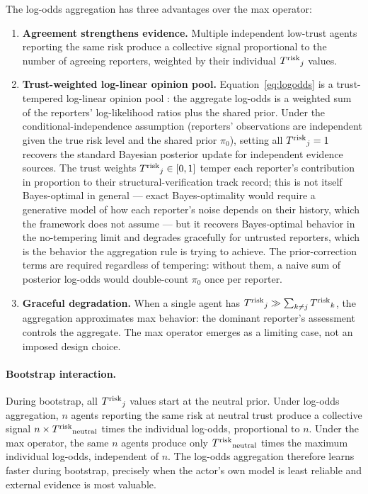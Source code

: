 The log-odds aggregation has three advantages over the max operator:
\begin{enumerate}
\item \textbf{Agreement strengthens evidence.} Multiple independent
    low-trust agents reporting the same risk produce a collective signal
    proportional to the number of agreeing reporters, weighted by their
    individual ${T^{\mathrm{risk}}}_j$ values.
\item \textbf{Trust-weighted log-linear opinion pool.}
    Equation~\eqref{eq:logodds} is a trust-tempered log-linear opinion
    pool \citep{genest1986combining}: the aggregate log-odds is a
    weighted sum of the reporters' log-likelihood ratios plus the
    shared prior. Under the conditional-independence assumption
    (reporters' observations are independent given the true risk
    level and the shared prior $\pi_0$), setting all ${T^{\mathrm{risk}}}_j = 1$
    recovers the standard Bayesian posterior update for independent
    evidence sources. The trust weights ${T^{\mathrm{risk}}}_j \in [0, 1]$ temper
    each reporter's contribution in proportion to their
    structural-verification track record; this is not itself
    Bayes-optimal in general --- exact Bayes-optimality would require
    a generative model of how each reporter's noise depends on their
    history, which the framework does not assume --- but it recovers
    Bayes-optimal behavior in the no-tempering limit and degrades
    gracefully for untrusted reporters, which is the behavior the
    aggregation rule is trying to achieve. The prior-correction
    terms are required regardless of tempering: without them, a naive
    sum of posterior log-odds would double-count $\pi_0$ once per
    reporter.
\item \textbf{Graceful degradation.} When a single agent has
    ${T^{\mathrm{risk}}}_j \gg \sum_{k \neq j} {T^{\mathrm{risk}}}_k$, the aggregation approximates
    max behavior: the dominant reporter's assessment controls the aggregate.
    The max operator emerges as a limiting case, not an imposed design
    choice.
\end{enumerate}

\paragraph{Bootstrap interaction.} During bootstrap, all ${T^{\mathrm{risk}}}_j$ values
start at the neutral prior. Under log-odds aggregation, $n$ agents
reporting the same risk at neutral trust produce a collective signal
$n \times {T^{\mathrm{risk}}}_{\mathrm{neutral}}$ times the individual log-odds,
proportional to $n$. Under the max operator, the same $n$ agents produce
only ${T^{\mathrm{risk}}}_{\mathrm{neutral}}$ times the maximum individual log-odds,
independent of $n$. The log-odds aggregation therefore learns faster during
bootstrap, precisely when the actor's own model is least reliable and
external evidence is most valuable.


